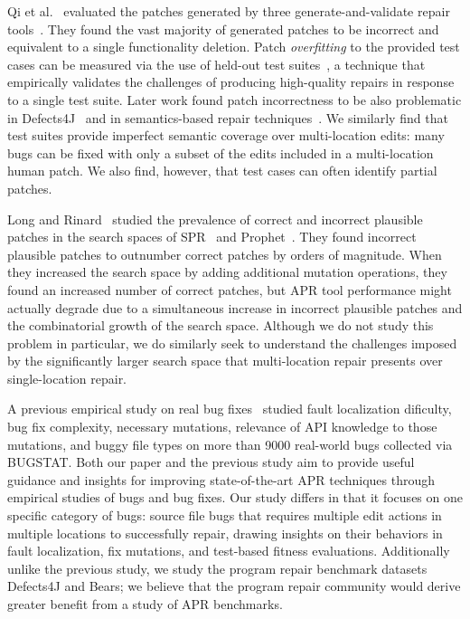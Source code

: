 \documentclass[sigconf, timestamp-false, anonymous=true]{acmart}
\begin{document}
Qi et al.~\cite{patch-correctness} evaluated the patches generated 
by three generate-and-validate repair tools~\cite{genprog, ae, rsrepair}. They found the 
vast majority of generated patches to be incorrect and equivalent to 
a single functionality deletion.  Patch \emph{overfitting} to the provided test
cases can be measured via the use of held-out test
suites~\cite{Smith15fse}, a technique that empirically validates the challenges of producing
high-quality repairs in response to a single test suite.   Later work found patch incorrectness to be 
also problematic in Defects4J~\cite{d4j-eval} and in semantics-based 
repair techniques~\cite{Le2018}.  We similarly find that test suites provide
imperfect semantic coverage over multi-location edits: many bugs can be fixed
with only a subset of the edits included in a multi-location human patch.  We 
also find, however, that test cases can often identify partial patches. 

Long and Rinard~\cite{long-search-spaces} studied the prevalence of 
correct and incorrect plausible patches in the search spaces of SPR~\cite{spr} 
and Prophet~\cite{prophet}. They found incorrect plausible patches to outnumber 
correct patches by orders of magnitude. When they increased the search space 
by adding additional mutation operations, they found an increased number of 
correct patches, but APR tool performance might actually degrade due to a 
simultaneous increase in incorrect plausible patches and the combinatorial 
growth of the search space.  Although we do not study this problem in
particular, we do similarly seek to understand the challenges imposed by the
significantly larger search space that multi-location repair presents over
single-location repair. 

A previous empirical study on real bug fixes~\cite{zhong2015} 
studied fault localization dificulty, bug fix complexity, necessary
mutations, relevance of API knowledge to those mutations, and buggy file types
on more than 9000 real-world bugs
collected via BUGSTAT.  
Both our paper and the previous study aim to provide useful guidance and insights for 
improving state-of-the-art APR techniques through empirical studies of bugs and bug fixes. 
Our study differs in that it focuses on one specific category of bugs: 
source file bugs that requires multiple edit actions in multiple locations to successfully repair, 
drawing insights on their behaviors in fault localization, fix mutations, and test-based 
fitness evaluations. Additionally unlike the previous study, we study the program repair 
benchmark datasets Defects4J 
and Bears; we believe that the program repair community would derive greater 
benefit from a study of APR benchmarks.
\end{document}
